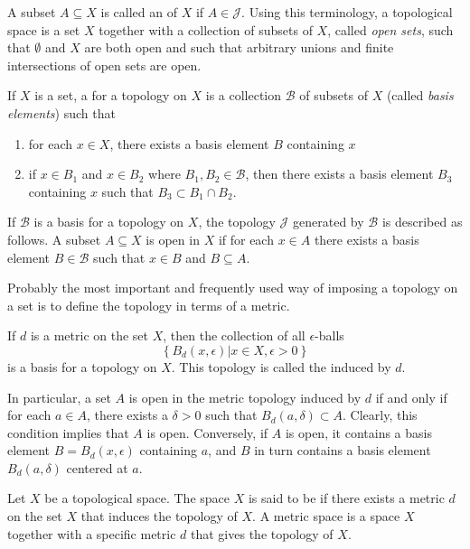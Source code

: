 A subset $A \subseteq X$ is called an  of $X$ if $A \in \mathcal{J}$.
Using this terminology, a topological space is a set $X$ together with a collection of subsets of $X$, called \emph{open sets}, such that $\emptyset$ and $X$ are both open and such that arbitrary unions and finite intersections of open sets are open.

\begin{definition}
If $X$ is a set, a  for a topology on $X$ is a collection $\mathcal{B}$ of subsets of $X$ (called \emph{basis elements}) such that
\begin{enumerate}
\item for each $x \in X$, there exists a basis element $B$ containing $x$
\item if $x \in B_1$ and $x \in B_2$ where $B_1, B_2 \in \mathcal{B}$, then there exists a basis element $B_3$ containing $x$ such that $B_3 \subset B_1 \cap B_2$.
\end{enumerate}
\end{definition}

If $\mathcal{B}$ is a basis for a topology on $X$, the topology $\mathcal{J}$ generated by $\mathcal{B}$ is described as follows.
A subset $A \subseteq X$ is open in $X$ if for each $x \in A$ there exists a basis element $B \in \mathcal{B}$ such that $x \in B$ and $B \subseteq A$. 

Probably the most important and frequently used way of imposing a topology on a set is to define the topology in terms of a metric.
\begin{definition}
If $d$ is a metric on the set $X$, then the collection of all $\epsilon$-balls
\begin{equation*}
\left\{ B_d (x, \epsilon) |  x \in X, \epsilon > 0 \right\}
\end{equation*}
is a basis for a topology on $X$.
This topology is called the  induced by $d$.
\end{definition}

In particular, a set $A$ is open in the metric topology induced by $d$ if and only if for each $a \in A$, there exists a $\delta > 0$ such that $B_d (a, \delta) \subset A$.
Clearly, this condition implies that $A$ is open.
Conversely, if $A$ is open, it contains a basis element $B = B_d (x, \epsilon)$ containing $a$, and $B$ in turn contains a basis element $B_d (a, \delta)$ centered at $a$.

\begin{definition}
Let $X$ be a topological space.
The space $X$ is said to be  if there exists a metric $d$ on the set $X$ that induces the topology of $X$.
A metric space is a space $X$ together with a specific metric $d$ that gives the topology of $X$.
\end{definition}


